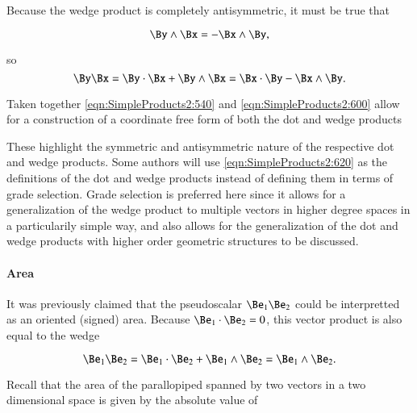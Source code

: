 Because the wedge product is completely antisymmetric, it must be true that

\begin{dmath}\label{eqn:SimpleProducts2:580}
\By \wedge \Bx = -\Bx \wedge \By,
\end{dmath}

so
\begin{dmath}\label{eqn:SimpleProducts2:600}
\By \Bx
= \By \cdot \Bx + \By \wedge \Bx
= \Bx \cdot \By - \Bx \wedge \By.
\end{dmath}

Taken together \cref{eqn:SimpleProducts2:540} and \cref{eqn:SimpleProducts2:600} allow for a construction of a coordinate free form of both the dot and wedge products


These highlight the symmetric and antisymmetric nature of the respective dot and wedge products.
Some authors will use \cref{eqn:SimpleProducts2:620} as the definitions of the dot and wedge products instead of defining them in terms of grade selection.
Grade selection is preferred here since it allows for a generalization of the wedge product to multiple vectors in higher degree spaces in a particularily simple way, and also allows for the generalization of the dot and wedge products with higher order geometric structures to be discussed.

\paragraph{Area}

It was previously claimed that the pseudoscalar \( \Be_1 \Be_2 \) could be interpretted as an oriented (signed) area.
Because \( \Be_1 \cdot \Be_2 = 0 \), this vector product is also equal to the wedge

\begin{dmath}\label{eqn:SimpleProducts2:640}
\Be_1 \Be_2 = \Be_1 \cdot \Be_2 +
\Be_1 \wedge \Be_2
=
\Be_1 \wedge \Be_2.
\end{dmath}

Recall that the area of the parallopiped spanned by two vectors in a two dimensional space is given by the absolute value of

